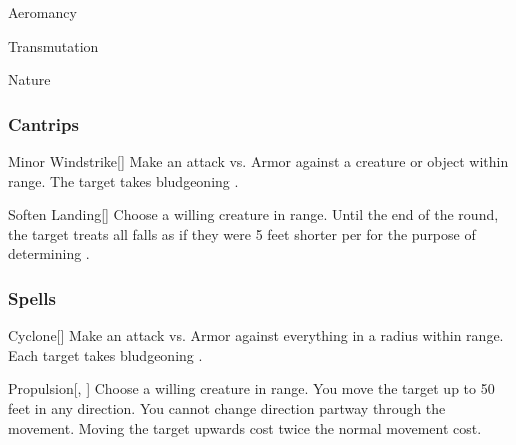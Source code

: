 
\begin{spellsection}{Aeromancy}

\begin{spellheader}
\end{spellheader}


 Transmutation

 Nature

\subsubsection{Cantrips}


\begin{freeability}{Minor Windstrike}[]
Make an attack vs. Armor against a creature or object within \rngmed range.
\hit The target takes bludgeoning .
\end{freeability}


\begin{freeability}{Soften Landing}[]
Choose a willing creature in \rngmed range.
Until the end of the round, the target treats all falls as if they were 5 feet shorter per  for the purpose of determining .
\end{freeability}

\end{spellsection}


\subsubsection{Spells}


\lowercase{\hypertarget{spell:Cyclone}{}}\label{spell:Cyclone}
\begin{apability}[\nth{1}]{\hypertarget{spell:Cyclone}{Cyclone}}[]
Make an attack vs. Armor against everything in a \areasmall radius within \rngmed range.
\hit Each target takes bludgeoning .
\end{apability}
\vspace{0.25em}



\lowercase{\hypertarget{spell:Propulsion}{}}\label{spell:Propulsion}
\begin{apability}[\nth{1}]{\hypertarget{spell:Propulsion}{Propulsion}}[, ]
Choose a willing creature in \rngclose range.
You move the target up to 50 feet in any direction.
You cannot change direction partway through the movement.
Moving the target upwards cost twice the normal movement cost.
\end{apability}
\vspace{0.25em}



